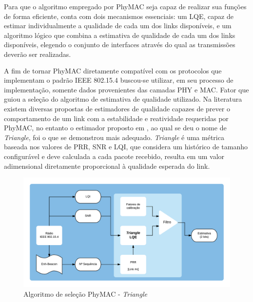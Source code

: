 \documentclass[
	12pt,				%
	openright,			%
	oneside,
	a4paper,			%
	english,			%
	french,				%
	spanish,			%
	brazil				%
	]{abntex2}
\begin{document}
Para que o algoritmo empregado por PhyMAC seja capaz de realizar sua funções de forma eficiente, conta com dois mecanismos essenciais: um LQE, capaz de estimar individualmente a qualidade de cada um dos links disponíveis, e um algoritmo lógico que combina a estimativa de qualidade de cada um dos links disponíveis, elegendo o conjunto de interfaces através do qual as transmissões deverão ser realizadas.

A fim de tornar PhyMAC diretamente compatível com os protocolos que implementam o padrão IEEE 802.15.4 buscou-se utilizar, em seu processo de implementação, somente dados provenientes das camadas PHY e MAC. Fator que guiou a seleção do algoritmo de estimativa de qualidade utilizado. Na literatura existem diversas propostas de estimadores de qualidade capazes de prever o comportamento de um link com a estabilidade e reatividade requeridas por PhyMAC, no entanto o estimador proposto em , ao qual se deu o nome de \textit{Triangle}, foi o que se demonstrou mais adequado. \textit{Triangle} é uma métrica baseada nos valores de PRR, SNR e LQI, que considera um histórico de tamanho configurável e deve calculada a cada pacote recebido, resulta em um valor adimensional diretamente proporcional à qualidade esperada do link.

\begin{figure}[htb]
	\centering
	\caption{Algoritmo de seleção PhyMAC - \textit{Triangle}}
	\label{fig_phymac_trng}
	\includegraphics[width=\linewidth]{PhyMAC_TRNG}
\end{figure}
\end{document}

